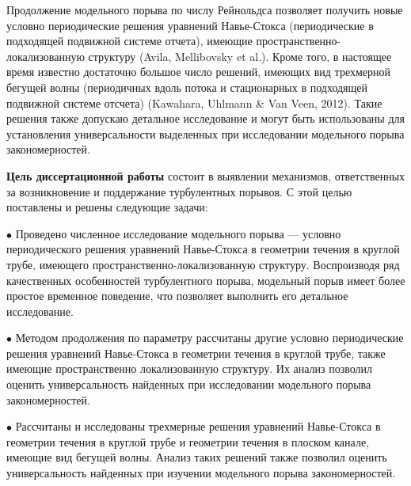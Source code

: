 Продолжение модельного порыва по числу Рейнольдса позволяет получить новые условно периодические решения уравнений Навье-Стокса (периодические в подходящей подвижной системе отчета), имеющие пространственно-локализованную структуру (Avila, Mellibovsky et al.). Кроме того, в настоящее время известно достаточно большое число решений, имеющих вид трехмерной бегущей волны (периодичных вдоль потока и стационарных в подходящей подвижной системе отсчета) (Kawahara, Uhlmann \& Van Veen, 2012). Такие решения также допускаю детальное исследование и могут быть использованы для установления универсальности выделенных при исследовании модельного порыва закономерностей. 

{\bf Цель диссертационной работы} состоит в выявлении механизмов, ответственных за возникновение и поддержание турбулентных порывов. 
С этой целью поставлены и решены следующие задачи: 

\noindent $\bullet$ Проведено численное исследование модельного порыва --- условно периодического решения уравнений Навье-Стокса в геометрии течения в круглой трубе, имеющего пространственно-локализованную структуру. Воспроизводя ряд качественных особенностей турбулентного порыва, модельный порыв имеет более простое временное поведение, что позволяет выполнить его детальное исследование. 

\noindent $\bullet$ Методом продолжения по параметру рассчитаны другие условно периодические решения уравнений Навье-Стокса в геометрии течения в круглой трубе, также имеющие пространственно локализованную структуру. Их анализ позволил оценить универсальность найденных при исследовании модельного порыва закономерностей. 

\noindent $\bullet$ Рассчитаны и исследованы трехмерные решения уравнений Навье-Стокса в геометрии течения в круглой трубе и геометрии течения в плоском канале, имеющие вид бегущей волны. Анализ таких решений также позволил оценить универсальность найденных при изучении модельного порыва закономерностей. 


